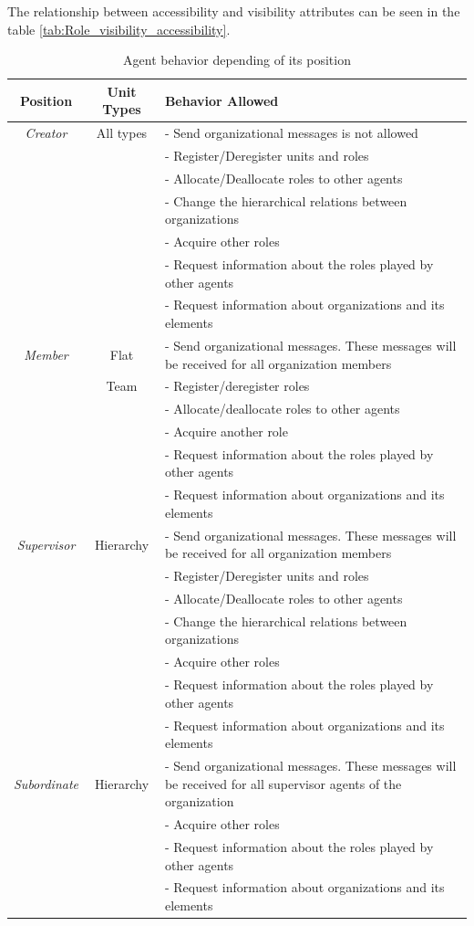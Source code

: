  The relationship between accessibility and visibility attributes  can be seen in the table \ref{tab:Role_visibility_accessibility}.


\begin{table}[!ht]
\begin{tabular}{|c| c|p{11cm}|}
\hline
\textbf{Position} & Unit Types & \textbf{  Behavior Allowed } \\ \hline
\textit{Creator} & All types& - Send organizational messages is not allowed \\
 && - Register/Deregister units and roles\\
 && - Allocate/Deallocate  roles to other agents\\
 && - Change the hierarchical relations between organizations\\
 && - Acquire other roles\\
 && - Request information about the roles played by other agents\\
 && - Request information about organizations and its elements\\ \hline
\textit{Member} &Flat& - Send organizational messages. These messages will be received for all organization members\\
 &Team& - Register/deregister roles\\
 && - Allocate/deallocate roles to other agents\\
 && - Acquire another role\\
 && - Request information about the roles played by other agents\\
 && - Request information about organizations and its elements\\ \hline
\textit{Supervisor} & Hierarchy&- Send organizational messages. These messages will be received for all organization members\\
&& - Register/Deregister units and roles\\
 && - Allocate/Deallocate  roles to other agents\\
 && - Change the hierarchical relations between organizations\\
 && - Acquire other roles\\
&& - Request information about the roles played by other agents\\
 && - Request information about organizations and its elements\\ \hline
\textit{Subordinate} &Hierarchy&  - Send organizational messages. These messages will be received for all supervisor agents of the organization\\

 && - Acquire other roles\\
&& - Request information about the roles played by other agents\\
 && - Request information about organizations and its elements\\ \hline
 \end{tabular}
\caption{Agent behavior depending of its position}
\label{tab:Role_position}
\end{table}


